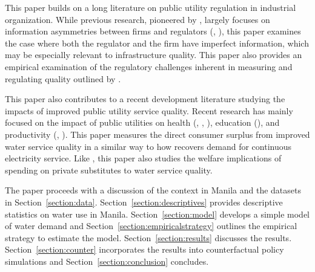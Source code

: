 \documentclass[12pt,table]{article}
\begin{document}
This paper builds on a long literature on public utility regulation in industrial organization.  While previous research, pioneered by \cite{laffont1993theory}, largely focuses on information asymmetries between firms and regulators (\cite{mcrae2015infrastructure}, \cite{lim2018dynamic}), this paper examines the case where both the regulator and the firm have imperfect information, which may be especially relevant to infrastructure quality.  This paper also provides an empirical examination of the regulatory challenges inherent in measuring and regulating quality outlined by \cite{spence1975monopoly}.

This paper also contributes to a recent development literature studying the impacts of improved public utility service quality.  Recent research has mainly focused on the impact of public utilities on health (\cite{bhalotra2017urban}, \cite{kosec2014child}, \cite{ashraf2017water}), education (\cite{zhang2016long}), and  productivity (\cite{allcott2016electricity}, \cite{hardy}).  This paper measures the direct consumer surplus from improved water service quality in a similar way to how \cite{mcrae2015infrastructure} recovers demand for continuous electricity service.  Like \cite{baisa2010welfare}, this paper also studies the welfare implications of spending on private substitutes to water service quality.

The paper proceeds with a discussion of the context in Manila and the datasets in Section~\ref{section:data}.  Section~\ref{section:descriptives} provides descriptive statistics on water use in Manila.  Section~\ref{section:model} develops a simple model of water demand and Section~\ref{section:empiricalstrategy} outlines the empirical strategy to estimate the model.  Section~\ref{section:results} discusses the results.  Section~\ref{section:counter} incorporates the results into counterfactual policy simulations and Section~\ref{section:conclusion} concludes.



\end{document}
